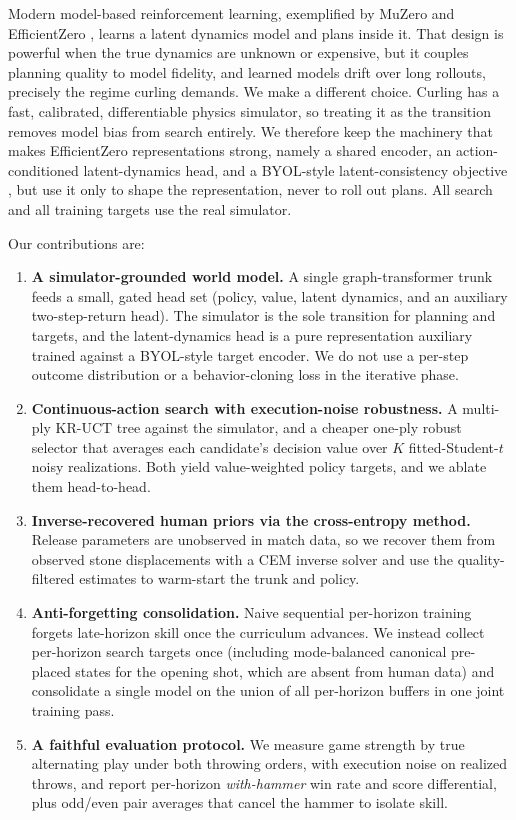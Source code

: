 \documentclass[11pt]{article}
\begin{document}
Modern model-based reinforcement learning, exemplified by MuZero
\cite{schrittwieser2020mastering} and EfficientZero \cite{ye2021mastering},
learns a latent dynamics model and plans inside it. That design is powerful
when the true dynamics are unknown or expensive, but it couples planning
quality to model fidelity, and learned models drift over long rollouts,
precisely the regime curling demands. We make a different choice. Curling has
a fast, calibrated, differentiable physics simulator, so treating it as the
transition removes model bias from search entirely. We therefore keep the
machinery that makes EfficientZero representations strong, namely a shared
encoder, an action-conditioned latent-dynamics head, and a BYOL-style
latent-consistency objective \cite{grill2020bootstrap}, but use it only to
shape the representation, never to roll out plans. All search and all
training targets use the real simulator.

Our contributions are:
\begin{enumerate}
\item \textbf{A simulator-grounded world model.} A single graph-transformer
trunk feeds a small, gated head set (policy, value, latent dynamics, and an
auxiliary two-step-return head). The simulator is the sole transition for
planning and targets, and the latent-dynamics head is a pure representation
auxiliary trained against a BYOL-style target encoder. We do not use a
per-step outcome distribution or a behavior-cloning loss in the iterative
phase.

\item \textbf{Continuous-action search with execution-noise robustness.} A
multi-ply KR-UCT tree \cite{yee2016monte} against the simulator, and a
cheaper one-ply robust selector that averages each candidate's decision
value over $K$ fitted-Student-$t$ noisy realizations. Both yield value-weighted
policy targets, and we ablate them head-to-head.

\item \textbf{Inverse-recovered human priors via the cross-entropy method.}
Release parameters are unobserved in match data, so we recover them from
observed stone displacements with a CEM \cite{deboer2005tutorial} inverse
solver and use the quality-filtered estimates to warm-start the trunk and
policy.

\item \textbf{Anti-forgetting consolidation.} Naive sequential per-horizon
training forgets late-horizon skill once the curriculum advances. We instead
collect per-horizon search targets once (including mode-balanced canonical
pre-placed states for the opening shot, which are absent from human data)
and consolidate a single model on the union of all per-horizon buffers in one
joint training pass.

\item \textbf{A faithful evaluation protocol.} We measure game strength by
true alternating play under both throwing orders, with execution noise on
realized throws, and report per-horizon \emph{with-hammer} win rate and score
differential, plus odd/even pair averages that cancel the hammer to isolate
skill.
\end{enumerate}
\end{document}
